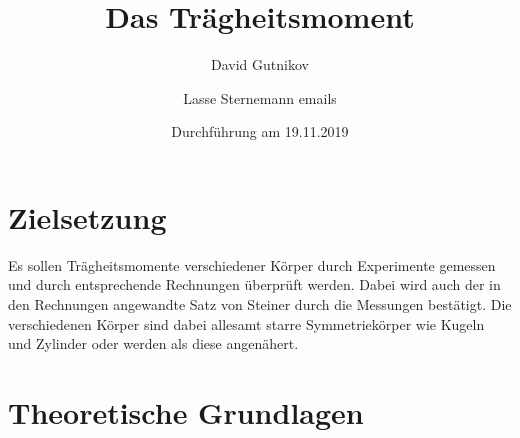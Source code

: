 \documentclass[titlepage = firstcover]{scrartcl}
\title{Das Trägheitsmoment}
\author{David Gutnikov \and Lasse Sternemann emails}
\date{Durchführung am 19.11.2019}
\begin{document}
    \maketitle
    \tableofcontents
    \newpage

    \section{Zielsetzung}
    Es sollen Trägheitsmomente verschiedener Körper durch Experimente gemessen und durch entsprechende Rechnungen überprüft werden. 
    Dabei wird auch der in den Rechnungen angewandte Satz von Steiner durch die Messungen bestätigt. Die verschiedenen Körper sind dabei 
    allesamt starre Symmetriekörper wie Kugeln und Zylinder oder werden als diese angenähert.

    \section{Theoretische Grundlagen}
\end{document}
